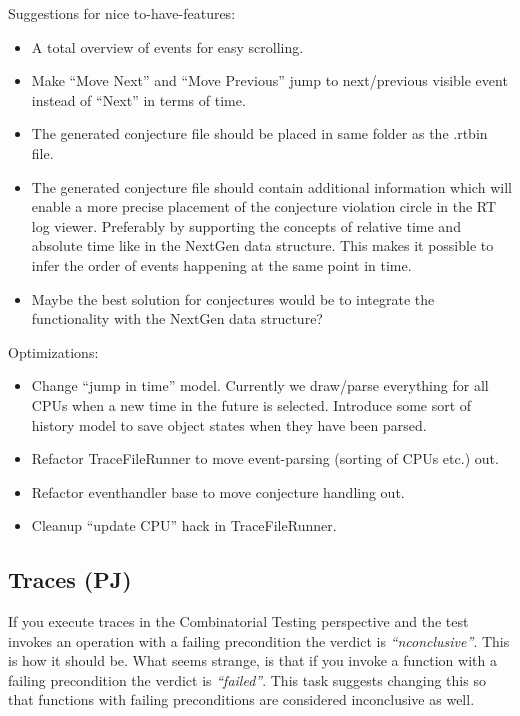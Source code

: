 \documentclass[11pt]{overturerep} \usepackage{t1enc,times,a4,t1enc}
\begin{document}
Suggestions for nice to-have-features: \begin{itemize} \item A total overview
        of events for easy scrolling.  \item Make ``Move Next'' and ``Move
            Previous'' jump to next/previous visible event instead of ``Next''
            in terms of time.
\item The generated conjecture file should be placed in same folder as the
.rtbin file.  \item The generated conjecture file should contain additional
    information which will enable a more precise placement of the conjecture
    violation circle in the RT log viewer. Preferably by supporting the
concepts of relative time and absolute time like in the NextGen data structure.
This makes it possible to infer the order of events happening at the same point
in time.  \item Maybe the best solution for conjectures would be to integrate
the functionality with the NextGen data structure?  \end{itemize}

Optimizations:

\begin{itemize} \item Change ``jump in time'' model. Currently we draw/parse
        everything for all CPUs when a new time in the future is selected.
    Introduce some sort of history model to save object states when they have
been parsed.  \item Refactor TraceFileRunner to move event-parsing (sorting of
CPUs etc.) out.  \item Refactor eventhandler base to move conjecture handling
out.  \item Cleanup ``update CPU'' hack in TraceFileRunner.  \end{itemize}



\subsection*{Traces (PJ)}

If you execute traces in the Combinatorial Testing perspective and the test invokes an operation with a failing precondition the verdict is \textit{``nconclusive''}. This is how it should be. What seems strange, is that if you invoke a function with a failing precondition the verdict is \textit{``failed''}. This task suggests changing this so that functions with failing preconditions are considered inconclusive as well.
\end{document}
